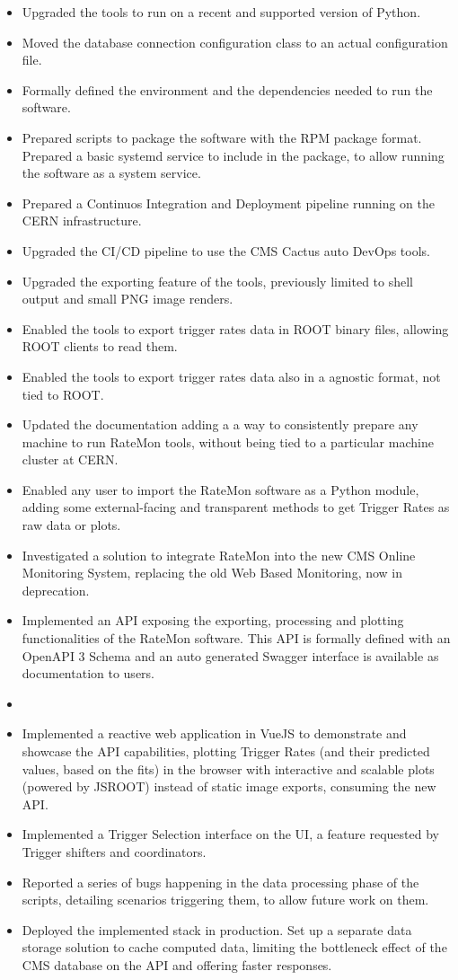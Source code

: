 \documentclass[a4, oneside, 10pt, nobib]{memoir}
\begin{document}
		\begin{itemize}

		\item Upgraded the tools to run on a recent and supported version of Python.
		\item Moved the database connection configuration class to an actual configuration file.
		\item Formally defined the environment and the dependencies needed to run the software.
		\item Prepared scripts to package the software with the RPM package format. Prepared a basic systemd service to include in the package, to allow running the software as a system service.
		\item Prepared a Continuos Integration and Deployment pipeline running on the CERN infrastructure.
		\item Upgraded the CI/CD pipeline to use the CMS Cactus auto DevOps tools.
		\item Upgraded the exporting feature of the tools, previously limited to shell output and small PNG image renders.
		\item Enabled the tools to export trigger rates data in ROOT binary files, allowing ROOT clients to read them.
		\item Enabled the tools to export trigger rates data also in a agnostic format, not tied to ROOT.
		\item Updated the documentation adding a a way to consistently prepare any machine to run RateMon tools, without being tied to a particular machine cluster at CERN.
		\item Enabled any user to import the RateMon software as a Python module, adding some external-facing and transparent methods to get Trigger Rates as raw data or plots.
		\item Investigated a solution to integrate RateMon into the new CMS Online Monitoring System, replacing the old Web Based Monitoring, now in deprecation.
		\item Implemented an API exposing the exporting, processing and plotting functionalities of the RateMon software. This API is formally defined with an OpenAPI 3 Schema and an auto generated Swagger interface is available as documentation to users.
		\item 
		\item Implemented a reactive web application in VueJS to demonstrate and showcase the API capabilities, plotting Trigger Rates (and their predicted values, based on the fits) in the browser with interactive and scalable plots (powered by JSROOT) instead of static image exports, consuming the new API.
		\item Implemented a Trigger Selection interface on the UI, a feature requested by Trigger shifters and coordinators.
		\item Reported a series of bugs happening in the data processing phase of the scripts, detailing scenarios triggering them, to allow future work on them.
		\item Deployed the implemented stack in production. Set up a separate data storage solution to cache computed data, limiting the bottleneck effect of the CMS database on the API and offering faster responses.


\end{itemize}
\end{document}
